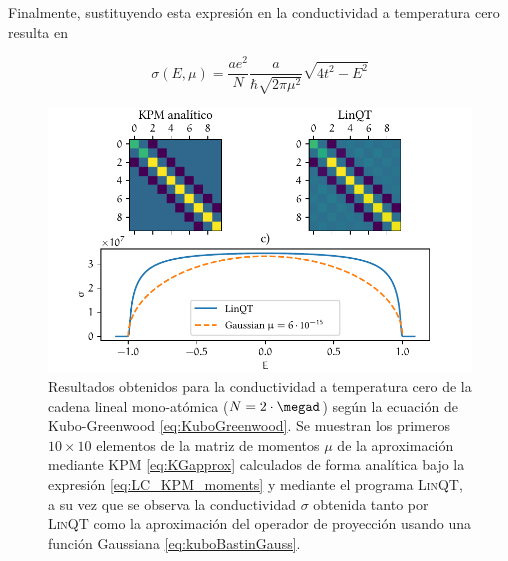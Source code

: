 Finalmente, sustituyendo esta expresión en la conductividad a temperatura cero resulta en

\begin{equation}\label{eq:kuboBastinGauss}
	\sigma(E, \mu) = \frac{a e^2}{N} \frac{a}{\hbar\sqrt{2\pi\mu^2}} \sqrt{4t^2 - E^2}
\end{equation}

\begin{figure}[bt]
	\centering
	\includegraphics{./img/LC_cond.pdf}
	\caption{Resultados obtenidos para la conductividad a temperatura cero de la cadena lineal mono-atómica ($ N = 2\cdot\megad $) según la ecuación de Kubo-Greenwood \eqref{eq:KuboGreenwood}. Se muestran los primeros $ 10 \times 10 $ elementos de la matriz de momentos $ \mu $ de la aproximación mediante KPM \eqref{eq:KGapprox} calculados de forma analítica bajo la expresión \eqref{eq:LC_KPM_moments} y mediante el programa \textsc{LinQT}, a su vez que se observa la conductividad $ \sigma $ obtenida tanto por \textsc{LinQT} como la aproximación del operador de proyección usando una función Gaussiana \eqref{eq:kuboBastinGauss}. \label{fig:LC_cond}}
\end{figure}
